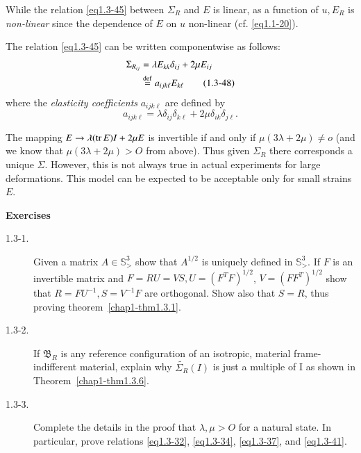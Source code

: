 \begin{remark}\label{chap1-rem1.3.6}%
  While the relation \eqref{eq1.3-45} between $\Sigma_R$ and $E$ is linear,
  as a function of $u, E_R$ is {\em{non-linear}} since the dependence of
  $E$ on $u$ non-linear (cf. \eqref{eq1.1-20}).  
\end{remark}

The relation \eqref{eq1.3-45} can be written componentwise as follows:
\begin{align*}
  \Sigma_{R_{ij}} & = \lambda  E_{kk} \delta_{ij} + 2\mu E_{ij}\\
  & \overset{\operatorname{def}}{=}  a_{ijk\ell} E_{k\ell}\tag{1.3-48}\label{eq1.3-48}
\end{align*}
where the \textit{elasticity coefficients} $a_{ijk\ell}$ are defined by  
\begin{equation*}
  a_{ijk\ell} = \lambda \delta_{ij} \delta_{k\ell} + 2\mu \delta_{ik}
  \delta_{j\ell}. \tag{1.3-49} \label{eq1.3-49}
\end{equation*}

The mapping $E \to \lambda(\operatorname{tr} E) I + 2\mu E$ is invertible if and only
if $\mu(3\lambda + 2\mu) \neq o$ (and we know that $\mu(3\lambda +
2\mu) > O$ from above). Thus given $\Sigma_R$ there corresponds a
unique $\Sigma$. However, this is not always true in actual
experiments for large deformations. This model can be expected to be
acceptable only for small strains $E$.  

\medskip
\begin{center}
{\large\bf Exercises}\pageoriginale
\end{center}

\begin{description}
\item[1.3-1.] Given a matrix $A \in \mathbb{S}^3_>$ show that
  $A^{1/2}$ is uniquely defined in $\mathbb{S}^3_>$. If $F$ is an
  invertible matrix and $F = RU = VS, U = (F^T F)^{1/2}$, $V=
  (FF^T)^{1/2}$ show that $R = FU^{-1}, S = V^{-1}F$ are
  orthogonal. Show also that $S = R$, thus proving
  theorem~\ref{chap1-thm1.3.1}. 

\item[1.3-2.] If $\mathfrak{B}_R$ is any reference configuration of an
  isotropic, material frame-indifferent material, explain why
  $\tilde{\Sigma_R}(I)$ is just a multiple of I as shown in
  Theorem~\ref{chap1-thm1.3.6}.   

\item[1.3-3.] Complete the details in the proof that $\lambda, \mu >
  O$ for a natural state. In particular, prove relations \eqref{eq1.3-32},
  \eqref{eq1.3-34}, \eqref{eq1.3-37}, and \eqref{eq1.3-41}.  
\end{description}

